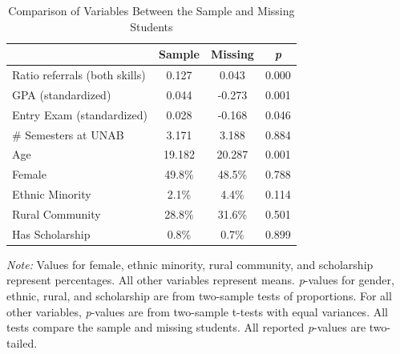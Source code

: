 \documentclass[11pt,a4paper,oneside]{article}
\begin{document}
\begin{table}[!htbp]
\centering
\begin{threeparttable}
\caption{Comparison of Variables Between the Sample and Missing Students}\label{tab:missing}
\begin{tabular*}{0.8\textwidth}{@{\extracolsep{\fill}}lcc c@{}}
\toprule
 & \multicolumn{1}{c}{\textbf{Sample}} & \multicolumn{1}{c}{\textbf{Missing}} & \multicolumn{1}{c}{\textit{\textbf{p}}} \\ \midrule
Ratio referrals (both skills)  & 0.127 & 0.043 & \multicolumn{1}{c}{0.000} \\
GPA (standardized) & 0.044 & -0.273 & \multicolumn{1}{c}{0.001} \\
Entry Exam (standardized) & 0.028 & -0.168 & \multicolumn{1}{c}{0.046} \\
\# Semesters at UNAB & 3.171 & 3.188 & \multicolumn{1}{c}{0.884} \\
Age & 19.182 & 20.287 & \multicolumn{1}{c}{0.001} \\
Female & 49.8\% & 48.5\% & \multicolumn{1}{c}{0.788} \\
Ethnic Minority & 2.1\% & 4.4\% & \multicolumn{1}{c}{0.114} \\
Rural Community & 28.8\% & 31.6\% & \multicolumn{1}{c}{0.501} \\
Has Scholarship & 0.8\% & 0.7\% & \multicolumn{1}{c}{0.899} \\
\bottomrule
\end{tabular*}
\begin{tablenotes}[flushleft]
\footnotesize
\item[] \textit{Note:} Values for female, ethnic minority, rural community, and scholarship represent percentages. All other variables represent means. \textit{p}-values for gender, ethnic, rural, and scholarship are from two-sample tests of proportions. For all other variables, \textit{p}-values are from two-sample t-tests with equal variances. All tests compare the sample and missing students. All reported \textit{p}-values are two-tailed.
\end{tablenotes}
\label{tab:test-results}
\end{threeparttable}
\end{table}
\end{document}
